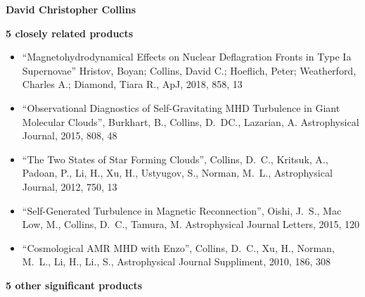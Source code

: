 \documentclass[11pt]{article}
\begin{document}
\noindent 
{\bf\large David Christopher Collins}

\medskip


\medskip

\noindent
\textbf{5 closely related products}
\vspace{-4mm}

\begin{itemize}

\item
``Magnetohydrodynamical Effects on Nuclear Deflagration Fronts in Type Ia Supernovae''
Hristov, Boyan; Collins, David C.; Hoeflich, Peter; Weatherford, Charles A.; Diamond, Tiara R., 
ApJ, 2018, 858, 13

\item ``Observational Diagnostics of Self-Gravitating MHD Turbulence in Giant
Molecular Clouds'', {Burkhart}, B., {Collins}, D.~DC., {Lazarian}, A.
Astrophysical Journal, 2015, 808, 48



\item 
``The Two States of Star Forming Clouds'', 
Collins, D.~C., Kritsuk, A., Padoan, P., Li, H., Xu, H., Ustyugov, S., Norman, M.~L.,
Astrophysical Journal, 2012, 750, 13

\item ``Self-Generated Turbulence in Magnetic Reconnection'', {Oishi}, J.~S.,
{Mac
Low}, M., {Collins}, D.~C., Tamura, M.  Astrophysical Journal Letters,
2015, 120


\item ``Cosmological AMR MHD with Enzo'', 
Collins, D.~C., Xu, H., Norman, M.~L., Li, H., Li., S.,
Astrophysical Journal Suppliment, 2010, 186, 308


\end{itemize}

\vspace{-2mm}
\noindent
\textbf{5 other significant products}
\vspace{-4mm}
\end{document}
